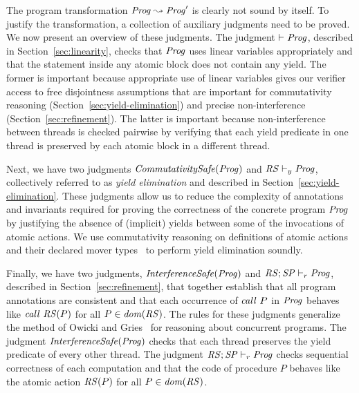 The program transformation $\mathit{Prog} \leadsto \mathit{Prog}'$ is clearly not sound by itself.
To justify the transformation, a collection of auxiliary judgments need to be proved.
We now present an overview of these judgments.
The judgment $\vdash \mathit{Prog}$, described in Section~\ref{sec:linearity}, 
checks that $\mathit{Prog}$ uses linear variables appropriately and that the statement
inside any atomic block does not contain any yield.
The former is important because appropriate use of linear variables gives our verifier access to free disjointness
assumptions that are important for commutativity reasoning (Section~\ref{sec:yield-elimination})
and precise non-interference (Section~\ref{sec:refinement}).
The latter is important because non-interference between threads is checked pairwise by verifying that each yield predicate
in one thread is preserved by each atomic block in a different thread.

Next, we have two judgments $\mathit{CommutativitySafe}(\mathit{Prog})$ and $\mathit{RS} \vdash_y \mathit{Prog}$, collectively 
referred to as {\em yield elimination\/} and described in Section~\ref{sec:yield-elimination}.
These judgments allow us to reduce the complexity of annotations and invariants 
required for proving the correctness of the concrete program $\mathit{Prog}$
by justifying the absence of (implicit) yields between some of the 
invocations of atomic actions.
We use commutativity reasoning on definitions of atomic actions and their declared mover types~\cite{FlanaganFLQ08,ElmasQT09}
to perform yield elimination soundly.

Finally, we have two judgments, $\mathit{InterferenceSafe}(\mathit{Prog})$ and $\mathit{RS};\mathit{SP} \vdash_r \mathit{Prog}$,
described in Section~\ref{sec:refinement},
that together establish that all program annotations are consistent and that 
each occurrence of $\mathit{call}\ P$ in $\mathit{Prog}$ behaves like $\mathit{call}\ \mathit{RS}(P)$ 
for all $P \in \mathit{dom}(\mathit{RS})$.
The rules for these judgments generalize the method of Owicki and Gries~\cite{OwickiG76} for reasoning about concurrent programs.
The judgment $\mathit{InterferenceSafe}(\mathit{Prog})$ checks that each thread preserves the
yield predicate of every other thread.
The judgment $\mathit{RS};\mathit{SP} \vdash_r \mathit{Prog}$ checks sequential correctness of each computation
and that the code of procedure $P$ behaves like the atomic action $\mathit{RS}(P)$ for all $P\in\mathit{dom}(\mathit{RS})$.

